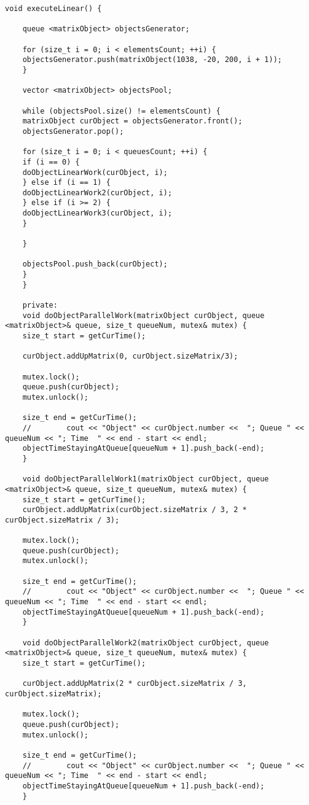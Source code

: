 \documentclass[12pt, a4paper]{report}
\begin{document}
\begin{lstlisting}[label=code:conveyor,caption=Реализация линейной и конвейерной обработки матрицы]
	void executeLinear() {
	
	queue <matrixObject> objectsGenerator;
	
	for (size_t i = 0; i < elementsCount; ++i) {
	objectsGenerator.push(matrixObject(1038, -20, 200, i + 1));
	}
	
	vector <matrixObject> objectsPool;
	
	while (objectsPool.size() != elementsCount) {
	matrixObject curObject = objectsGenerator.front();
	objectsGenerator.pop();
	
	for (size_t i = 0; i < queuesCount; ++i) {
	if (i == 0) {
	doObjectLinearWork(curObject, i);
	} else if (i == 1) {
	doObjectLinearWork2(curObject, i);
	} else if (i >= 2) {
	doObjectLinearWork3(curObject, i);
	}
	
	}
	
	objectsPool.push_back(curObject);
	}
	}
	
	private:
	void doObjectParallelWork(matrixObject curObject, queue <matrixObject>& queue, size_t queueNum, mutex& mutex) {
	size_t start = getCurTime();
	
	curObject.addUpMatrix(0, curObject.sizeMatrix/3);
	
	mutex.lock();
	queue.push(curObject);
	mutex.unlock();
	
	size_t end = getCurTime();
	//        cout << "Object" << curObject.number <<  "; Queue " << queueNum << "; Time  " << end - start << endl;
	objectTimeStayingAtQueue[queueNum + 1].push_back(-end);
	}
	
	void doObjectParallelWork1(matrixObject curObject, queue <matrixObject>& queue, size_t queueNum, mutex& mutex) {
	size_t start = getCurTime();
	curObject.addUpMatrix(curObject.sizeMatrix / 3, 2 * curObject.sizeMatrix / 3);
	
	mutex.lock();
	queue.push(curObject);
	mutex.unlock();
	
	size_t end = getCurTime();
	//        cout << "Object" << curObject.number <<  "; Queue " << queueNum << "; Time  " << end - start << endl;
	objectTimeStayingAtQueue[queueNum + 1].push_back(-end);
	}
	
	void doObjectParallelWork2(matrixObject curObject, queue <matrixObject>& queue, size_t queueNum, mutex& mutex) {
	size_t start = getCurTime();
	
	curObject.addUpMatrix(2 * curObject.sizeMatrix / 3, curObject.sizeMatrix);
	
	mutex.lock();
	queue.push(curObject);
	mutex.unlock();
	
	size_t end = getCurTime();
	//        cout << "Object" << curObject.number <<  "; Queue " << queueNum << "; Time  " << end - start << endl;
	objectTimeStayingAtQueue[queueNum + 1].push_back(-end);
	}
	

\end{lstlisting}
\end{document}
